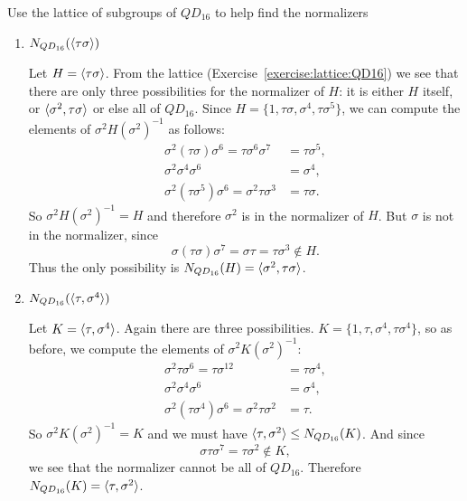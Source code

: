  Use the lattice of subgroups of $QD_{16}$ to help find
the normalizers
\begin{enumerate}
\item $N_{QD_{16}}(\langle{\tau\sigma}\rangle)$
  \begin{solution}
    Let $H = \langle{\tau\sigma}\rangle$. From the lattice
    (Exercise~\ref{exercise:lattice:QD16}) we see that there are only
    three possibilities for the normalizer of $H$: it is either $H$
    itself, or $\langle{\sigma^2,\tau\sigma}\rangle$ or else all of
    $QD_{16}$. Since $H = \{1,\tau\sigma,\sigma^4,\tau\sigma^5\}$, we
    can compute the elements of $\sigma^2H(\sigma^2)^{-1}$ as follows:
    \begin{align*}
      \sigma^2(\tau\sigma)\sigma^6 = \tau\sigma^6\sigma^7
      &= \tau\sigma^5, \\
      \sigma^2\sigma^4\sigma^6 &= \sigma^4, \\
      \sigma^2(\tau\sigma^5)\sigma^6
      = \sigma^2\tau\sigma^3 &= \tau\sigma.
    \end{align*}
    So $\sigma^2H(\sigma^2)^{-1} = H$ and therefore $\sigma^2$ is in
    the normalizer of $H$. But $\sigma$ is not in the normalizer,
    since
    \begin{equation*}
      \sigma(\tau\sigma)\sigma^7 = \sigma\tau = \tau\sigma^3\not\in H.
    \end{equation*}
    Thus the only possibility is
    $N_{QD_{16}}(H) = \langle{\sigma^2,\tau\sigma}\rangle$.
  \end{solution}
\item $N_{QD_{16}}(\langle{\tau, \sigma^4}\rangle)$
  \begin{solution}
    Let $K = \langle{\tau, \sigma^4}\rangle$. Again there are three
    possibilities. $K = \{1, \tau, \sigma^4, \tau\sigma^4\}$, so as
    before, we compute the elements of $\sigma^2K(\sigma^2)^{-1}$:
    \begin{align*}
      \sigma^2\tau\sigma^6 = \tau\sigma^{12} &= \tau\sigma^4, \\
      \sigma^2\sigma^4\sigma^6 &= \sigma^4, \\
      \sigma^2(\tau\sigma^4)\sigma^6 = \sigma^2\tau\sigma^2
      &= \tau.
    \end{align*}
    So $\sigma^2K(\sigma^2)^{-1} = K$ and we must have
    $\langle{\tau, \sigma^2}\rangle\leq N_{QD_{16}}(K)$. And since
    \begin{equation*}
      \sigma\tau\sigma^7 = \tau\sigma^2\not\in K,
    \end{equation*}
    we see that the normalizer cannot be all of $QD_{16}$. Therefore
    $N_{QD_{16}}(K) = \langle{\tau,\sigma^2}\rangle$.
  \end{solution}
\end{enumerate}
